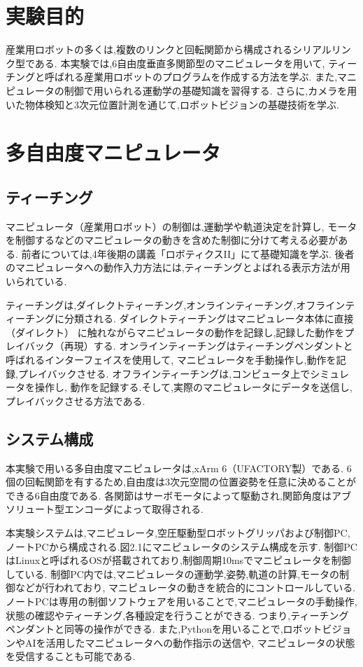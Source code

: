 
\section{実験目的}

産業用ロボットの多くは,複数のリンクと回転関節から構成されるシリアルリンク型である.
本実験では,6自由度垂直多関節型のマニピュレータを用いて,
ティーチングと呼ばれる産業用ロボットのプログラムを作成する方法を学ぶ.
また,マニピュレータの制御で用いられる運動学の基礎知識を習得する.
さらに,カメラを用いた物体検知と3次元位置計測を通じて,ロボットビジョンの基礎技術を学ぶ.


\section{多自由度マニピュレータ}

\subsection{ティーチング}
マニピュレータ（産業用ロボット）の制御は,運動学や軌道決定を計算し,
モータを制御するなどのマニピュレータの動きを含めた制御に分けて考える必要がある.
前者については,4年後期の講義「ロボティクスII」にて基礎知識を学ぶ.
後者のマニピュレータへの動作入力方法には,ティーチングとよばれる表示方法が用いられている.

ティーチングは,ダイレクトティーチング,オンラインティーチング,オフラインティーチングに分類される.
ダイレクトティーチングはマニピュレータ本体に直接（ダイレクト）
に触れながらマニピュレータの動作を記録し,記録した動作をプレイバック（再現）する.
オンラインティーチングはティーチングペンダントと呼ばれるインターフェイスを使用して,
マニピュレータを手動操作し,動作を記録,プレイバックさせる.
オフラインティーチングは,コンピュータ上でシミュレータを操作し,
動作を記録する.そして,実際のマニピュレータにデータを送信し,
プレイバックさせる方法である.

\subsection{システム構成}
本実験で用いる多自由度マニピュレータは,xArm 6（UFACTORY製）である.
6個の回転関節を有するため,自由度は3次元空間の位置姿勢を任意に決めることができる6自由度である.
各関節はサーボモータによって駆動され,関節角度はアブソリュート型エンコーダによって取得される.

本実験システムは,マニピュレータ,空圧駆動型ロボットグリッパおよび制御PC,
ノートPCから構成される.図2.1にマニピュレータのシステム構成を示す.
制御PCはLinuxと呼ばれるOSが搭載されており,制御周期10msでマニピュレータを制御している.
制御PC内では,マニピュレータの運動学,姿勢,軌道の計算,モータの制御などが行われており,
マニピュレータの動きを統合的にコントロールしている.
ノートPCは専用の制御ソフトウェアを用いることで,マニピュレータの手動操作,
状態の確認やティーチング,各種設定を行うことができる.
つまり,ティーチングペンダントと同等の操作ができる.
また,Pythonを用いることで,ロボットビジョンやAIを活用したマニピュレータへの動作指示の送信や,
マニピュレータの状態を受信することも可能である.

